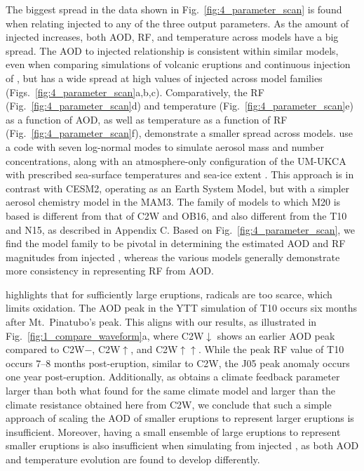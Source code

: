 \documentclass[draft]{agujournal2019}
\begin{document}
  The biggest spread in the data shown in Fig.~\ref{fig:4_parameter_scan} is found when
  relating injected  to any of the three output parameters. As the amount of
  injected  increases, both AOD, RF, and temperature across models have a big
  spread. The AOD to injected  relationship is consistent within similar models,
  even when comparing simulations of volcanic eruptions \cite{timmreck2010} and
  continuous injection of  \cite{niemeier2015}, but has a wide spread at high
  values of injected  across model families
  (Figs.~\ref{fig:4_parameter_scan}a,b,c). Comparatively, the RF
  (Fig.~\ref{fig:4_parameter_scan}d) and temperature (Fig.~\ref{fig:4_parameter_scan}e)
  as a function of AOD, as well as temperature as a function of RF
  (Fig.~\ref{fig:4_parameter_scan}f), demonstrate a smaller spread across models.
   use a code with seven log-normal
  modes to simulate aerosol mass and number concentrations, along with an
  atmosphere-only configuration of the UM-UKCA with prescribed sea-surface temperatures
  and sea-ice extent \cite{marshall2019}. This approach is in contrast with CESM2,
  operating as an Earth System Model, but with a simpler aerosol chemistry model in the
  MAM3. The family of models to which M20 is based is different from that of C2W and
  OB16, and also different from the T10 and N15, as described in Appendix C. Based on
  Fig.~\ref{fig:4_parameter_scan}, we find the model family to be pivotal in determining
  the estimated AOD and RF magnitudes from injected , whereas the various models
  generally demonstrate more consistency in representing RF from AOD.

   highlights that for sufficiently large eruptions, 
  radicals are too scarce, which limits  oxidation. The AOD peak in the YTT
  simulation of T10 occurs six months after Mt.\ Pinatubo's peak. This aligns with our
  results, as illustrated in Fig.~\ref{fig:1_compare_waveform}a, where C2W\(\downarrow\)
  shows an earlier AOD peak compared to C2W\(-\), C2W\(\uparrow\), and
  C2W\(\uparrow\uparrow\). While the peak RF value of T10 occurs \(7\)--\(8\) months
  post-eruption, similar to C2W, the J05 peak anomaly occurs one year post-eruption.
  Additionally, as  obtains a climate feedback parameter larger than
  both what  found for the same climate model and larger than the
  climate resistance obtained here from C2W, we conclude that such a simple approach of
  scaling the AOD of smaller eruptions to represent larger eruptions is insufficient.
  Moreover, having a small ensemble of large eruptions to represent smaller eruptions is
  also insufficient when simulating from injected , as both AOD and temperature
  evolution are found to develop differently.
\end{document}
